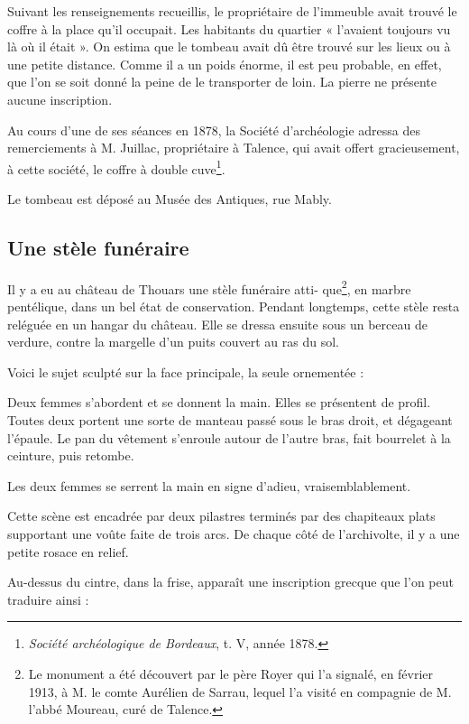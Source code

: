 \documentclass[a4paper,11pt]{book}
\begin{document}
Suivant les renseignements recueillis, le propriétaire de l'immeuble avait trouvé le coffre à la place qu'il occupait. Les habitants du quartier « l'avaient toujours vu là où il était ». On estima que le tombeau avait dû être trouvé sur les lieux ou à une petite distance. Comme il a un poids énorme, il est peu probable, en effet, que l'on se soit donné la peine de le transporter de loin. La pierre ne présente aucune inscription.

Au cours d'une de ses séances en 1878, la Société d'archéologie adressa des remerciements à M. Juillac, propriétaire à Talence, qui avait offert gracieusement, à cette société, le coffre à double cuve\footnote{\textit{Société archéologique de Bordeaux}, t. V, année 1878.}.

Le tombeau est déposé au Musée des Antiques, rue Mably.

\subsection{Une stèle funéraire}

Il y a eu au château de Thouars une stèle funéraire atti-
que\footnote{Le monument a été découvert par le père Royer qui l'a signalé, en février 1913, à M. le comte Aurélien de Sarrau, lequel l'a visité en compagnie de M. l'abbé Moureau, curé de Talence.}, en marbre pentélique, dans un bel état de conservation. Pendant longtemps, cette stèle resta reléguée en un hangar du château. Elle se dressa ensuite sous un berceau de verdure, contre la margelle d'un puits couvert au ras du sol.

Voici le sujet sculpté sur la face principale, la seule ornementée :

Deux femmes s'abordent et se donnent la main. Elles se présentent de profil. Toutes deux portent une sorte de manteau passé sous le bras droit, et dégageant l'épaule. Le pan du vêtement s'enroule autour de l'autre bras, fait bourrelet à la ceinture, puis retombe.

Les deux femmes se serrent la main en signe d'adieu, vraisemblablement.

Cette scène est encadrée par deux pilastres terminés par des chapiteaux plats supportant une voûte faite de trois arcs. De chaque côté de l'archivolte, il y a une petite rosace en relief.

Au-dessus du cintre, dans la frise, apparaît une inscription grecque que l'on peut traduire ainsi :

\leftskip=3cm
\end{document}
